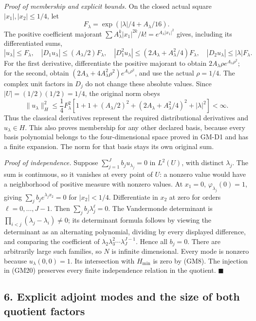 \documentclass[
  11pt,
]{article}
\begin{document}
\emph{Proof of membership and explicit bounds.} On the closed actual
square \(|x_1|,|x_2|\leq1/4\), let \[
 F_\lambda=\exp\left(|\lambda|/4+A_\lambda/16\right).
\] The
positive coefficient majorant \(\sum A_\lambda^k|x_1|^{2k}/k!=e^{A_\lambda|x_1|^2}\) gives,
including its differentiated sums, \[
 |u_\lambda|\leq F_\lambda,
 \quad |D_1u_\lambda|\leq(A_\lambda/2)F_\lambda,
 \quad |D_1^2u_\lambda|\leq(2A_\lambda+A_\lambda^2/4)F_\lambda,
 \quad |D_2u_\lambda|\leq|\lambda|F_\lambda.
 \tag{GM39}
\] For the
first derivative, differentiate the positive majorant to obtain
\(2A_\lambda\rho e^{A_\lambda\rho^2}\); for the second, obtain
\((2A_\lambda+4A_\lambda^2\rho^2)e^{A_\lambda\rho^2}\), and use the actual
\(\rho=1/4\). The complex unit factors in
\(D_j\) do not change these absolute values. Since
\(|U|=(1/2)(1/2)=1/4\), the original norm obeys
\[
 \|u_\lambda\|_H^2\leq\frac14 F_\lambda^2
       \left[1+1+(A_\lambda/2)^2
                +(2A_\lambda+A_\lambda^2/4)^2+|\lambda|^2\right]<\infty.
 \tag{GM40}
\] Thus the classical derivatives represent the
required distributional derivatives and \(u_\lambda\in H\). This
also proves membership for any other declared basis, because every basis
polynomial belongs to the four-dimensional space proved in GM-D1 and has
a finite expansion. The norm for that basis stays its own original sum.

\emph{Proof of independence.} Suppose \(\sum_{j=1}^J b_j u_{\lambda_j}=0\) in
\(L^2(U)\), with distinct \(\lambda_j\).
The sum is continuous, so it vanishes at every point of
\(U\): a nonzero value would have a neighborhood of
positive measure with nonzero values. At \(x_1=0\),
\(\varphi_{\lambda_j}(0)=1\), giving \(\sum_j b_j e^{\lambda_jx_2}=0\) for
\(|x_2|<1/4\). Differentiate in \(x_2\)
at zero for orders \(\ell=0,\ldots,J-1\). Then
\(\sum_j b_j\lambda_j^\ell=0\). The Vandermonde determinant is
\(\prod_{i<j}(\lambda_j-\lambda_i)\neq0\); its determinant formula follows by viewing
the determinant as an alternating polynomial, dividing by every
displayed difference, and comparing the coefficient of
\(\lambda_2\lambda_3^2\cdots\lambda_J^{J-1}\). Hence all \(b_j=0\). There
are arbitrarily large such families, so \(N\) is
infinite dimensional. Every mode is nonzero because
\(u_\lambda(0,0)=1\). Its intersection with
\(H_{\min}\) is zero by (GM8). The injection in (GM20)
preserves every finite independence relation in the quotient.
\hfill\ensuremath{\blacksquare}

\subsection{6. Explicit adjoint modes and the size of both quotient
factors}\label{explicit-adjoint-modes-and-the-size-of-both-quotient-factors}
\end{document}
